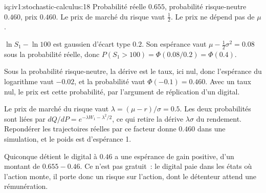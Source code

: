 \begin{solution}{iq:iv1:stochastic-calculus:18}
Probabilité réelle $0.655$, probabilité risque-neutre $0.460$, prix $0.460$. Le prix de marché du risque vaut $\frac12$. Le prix ne dépend pas de $\mu$.

$\ln S_1 - \ln 100$ est gaussien d'écart type $0.2$. Son espérance vaut $\mu - \frac12\sigma^2 = 0.08$ sous la probabilité réelle, donc $P(S_1 > 100) = \Phi(0.08/0.2) = \Phi(0.4)$.

Sous la probabilité risque-neutre, la dérive est le taux, ici nul, donc l'espérance du logarithme vaut $-0.02$, et la probabilité vaut $\Phi(-0.1) = 0.460$. Avec un taux nul, le prix est cette probabilité, par l'argument de réplication d'un digital.

Le prix de marché du risque vaut $\lambda = (\mu - r)/\sigma = 0.5$. Les deux probabilités sont liées par $dQ/dP = e^{-\lambda W_1 - \lambda^2/2}$, ce qui retire la dérive $\lambda\sigma$ du rendement. Repondérer les trajectoires réelles par ce facteur donne $0.460$ dans une simulation, et le poids est d'espérance 1.

Quiconque détient le digital à $0.46$ a une espérance de gain positive, d'un montant de $0.655 - 0.46$. Ce n'est pas gratuit~: le digital paie dans les états où l'action monte, il porte donc un risque sur l'action, dont le détenteur attend une rémunération.



\end{solution}


